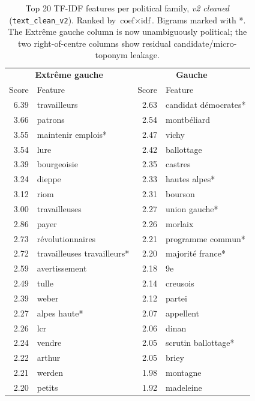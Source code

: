 \documentclass{article}
\begin{document}
\begin{table}[h]
  \caption{Top 20 TF-IDF features per political family, \emph{v2 cleaned} (\texttt{text\_clean\_v2}). Ranked by $\text{coef} \times \text{idf}$. Bigrams marked with *. The Extr\^{e}me gauche column is now unambiguously political; the two right-of-centre columns show residual candidate/micro-toponym leakage.}
  \label{tab:top_features_v2}
  \centering
  \small
  \begin{tabular}{rlrl}
    \toprule
    \multicolumn{2}{c}{\textbf{Extr\^{e}me gauche}} & \multicolumn{2}{c}{\textbf{Gauche}} \\
    Score & Feature & Score & Feature \\
    \midrule
    6.39 & travailleurs          & 2.63 & candidat d\'{e}mocrates* \\
    3.66 & patrons               & 2.54 & montb\'{e}liard \\
    3.55 & maintenir emplois*    & 2.47 & vichy \\
    3.54 & lure                  & 2.42 & ballottage \\
    3.39 & bourgeoisie           & 2.35 & castres \\
    3.24 & dieppe                & 2.33 & hautes alpes* \\
    3.12 & riom                  & 2.31 & bourson \\
    3.00 & travailleuses         & 2.27 & union gauche* \\
    2.86 & payer                 & 2.26 & morlaix \\
    2.73 & r\'{e}volutionnaires  & 2.21 & programme commun* \\
    2.72 & travailleuses travailleurs* & 2.20 & majorit\'{e} france* \\
    2.59 & avertissement         & 2.18 & 9e \\
    2.49 & tulle                 & 2.14 & creusois \\
    2.39 & weber                 & 2.12 & partei \\
    2.27 & alpes haute*          & 2.07 & appellent \\
    2.26 & lcr                   & 2.06 & dinan \\
    2.24 & vendre                & 2.05 & scrutin ballottage* \\
    2.22 & arthur                & 2.05 & briey \\
    2.21 & werden                & 1.98 & montagne \\
    2.20 & petits                & 1.92 & madeleine \\

\end{tabular}
\end{table}
\end{document}
